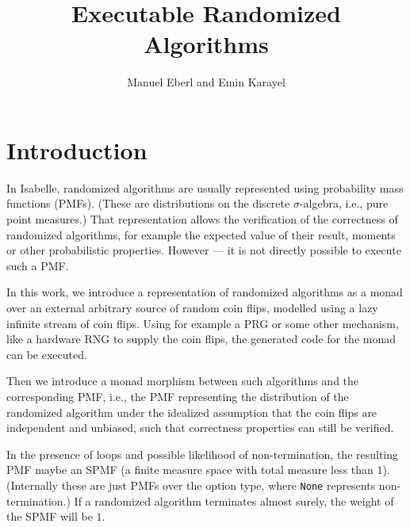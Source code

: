 \documentclass[11pt,a4paper]{article}
\begin{document}
\title{Executable Randomized Algorithms}
\author{Manuel Eberl and Emin Karayel}
\maketitle


\tableofcontents

\section{Introduction}
In Isabelle, randomized algorithms are usually represented using probability mass functions (PMFs). 
(These are distributions on the discrete $\sigma$-algebra, i.e., pure point measures.) That 
representation allows the verification of the correctness of randomized algorithms, for example
the expected value of their result, moments or other probabilistic properties. However --- it is not 
directly possible to execute such a PMF.

In this work, we introduce a representation of randomized algorithms as a monad over an external 
arbitrary source of random coin flips, modelled using a lazy infinite stream of coin flips. Using
for example a PRG or some other mechanism, like a hardware RNG to supply the coin flips, the
generated code for the monad can be executed.

Then we introduce a monad morphism between such algorithms and the corresponding PMF, i.e., the PMF
representing the distribution of the randomized algorithm under the idealized assumption that the 
coin flips are independent and unbiased, such that correctness properties can still be verified.

In the presence of loops and possible likelihood of non-termination, the resulting PMF maybe an
SPMF (a finite measure space with total measure less than $1$). (Internally these are just PMFs over
the option type, where \verb+None+ represents non-termination.) If a randomized algorithm terminates
almost surely, the weight of the SPMF will be $1$.
\end{document}
